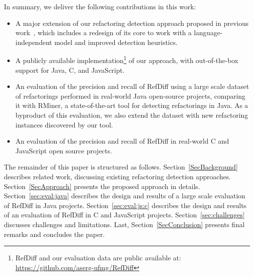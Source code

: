 In summary, we deliver the following contributions in this work:
\begin{itemize}
\item A major extension of our refactoring detection approach proposed in previous work~\cite{msr2017}, which includes a redesign of its core to work with a language-independent model and improved detection heuristics.
\item A publicly available implementation\footnote{RefDiff and our evaluation data are public available at:\\
\url{https://github.com/aserg-ufmg/RefDiff}}
of our approach, with out-of-the-box support for Java, C, and JavaScript.
\item An evaluation of the precision and recall of RefDiff using a large scale dataset of refactorings performed in real-world Java open-source projects, comparing it with RMiner, a state-of-the-art tool for detecting refactorings in Java. As a byproduct of this evaluation, we also extend the dataset with new refactoring instances discovered by our tool.
\item An evaluation of the precision and recall of RefDiff in real-world C and JavaScript open source projects.
\end{itemize}

The remainder of this paper is structured as follows.
Section~\ref{SecBackground} describes related work, discussing existing refactoring detection approaches.
Section~\ref{SecApproach} presents the proposed approach in details.
Section~\ref{sec:eval:java} describes the design and results of a large scale evaluation of RefDiff in Java projects.
Section~\ref{sec:eval:js:c} describes the design and results of an evaluation of RefDiff in C and JavaScript projects.
Section~\ref{sec:challenges} discusses challenges and limitations.
Last, Section~\ref{SecConclusion} presents final remarks and concludes the paper.
